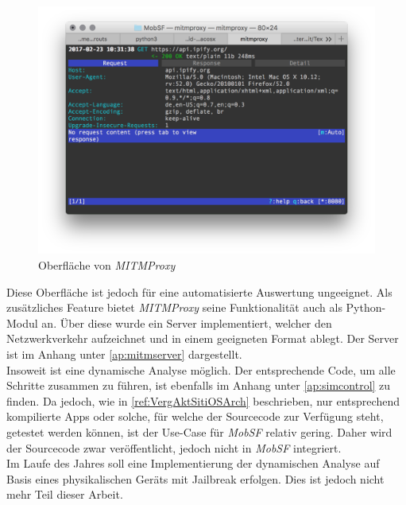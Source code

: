 \begin{figure}[htbp]
	\centering
	\includegraphics[width=\textwidth]{bilder/pentest_mobile_anwendungen/weiterentw_mobsf/mitmproxy_ncurses.png}
	\caption{Oberfläche von \textit{MITMProxy}}
	\label{fig:WeitMobSFiOSMITMProxUI}
\end{figure}

Diese Oberfläche ist jedoch für eine automatisierte Auswertung ungeeignet. Als zusätzliches Feature bietet \textit{MITMProxy} seine Funktionalität auch als Python-Modul an. Über diese wurde ein Server implementiert, welcher den Netzwerkverkehr aufzeichnet und in einem geeigneten Format ablegt. Der Server ist im Anhang unter \ref{ap:mitmserver} dargestellt.\\

Insoweit ist eine dynamische Analyse möglich. Der entsprechende Code, um alle Schritte zusammen zu führen, ist ebenfalls im Anhang unter \ref{ap:simcontrol} zu finden. Da jedoch, wie in \ref{ref:VergAktSitiOSArch} beschrieben, nur entsprechend kompilierte Apps oder solche, für welche der Sourcecode zur Verfügung steht, getestet werden können, ist der Use-Case für \textit{MobSF} relativ gering. Daher wird der Sourcecode zwar veröffentlicht, jedoch nicht in \textit{MobSF} integriert.\\

Im Laufe des Jahres soll eine Implementierung der dynamischen Analyse auf Basis eines physikalischen Geräts mit Jailbreak erfolgen. Dies ist jedoch nicht mehr Teil dieser Arbeit.


